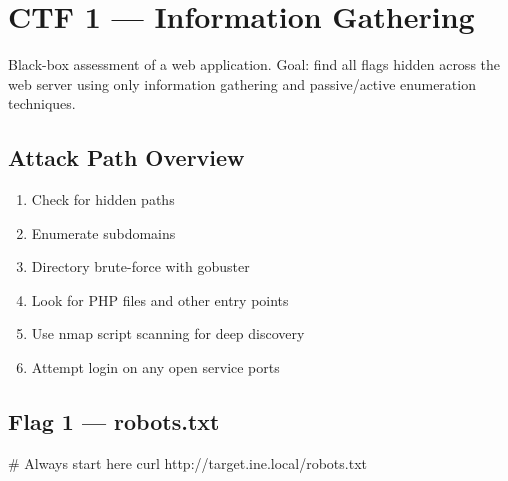 \chapter{CTF 1 --- Information Gathering}
\label{ctf:ctf1}

\begin{notebox}
Black-box assessment of a web application. Goal: find all flags hidden across
the web server using only information gathering and passive/active enumeration
techniques.
\end{notebox}

\section*{Attack Path Overview}

\begin{enumerate}
  \item Check  for hidden paths
  \item Enumerate subdomains
  \item Directory brute-force with gobuster
  \item Look for PHP files and other entry points
  \item Use nmap script scanning for deep discovery
  \item Attempt login on any open service ports
\end{enumerate}

\section*{Flag 1 --- robots.txt}



\begin{termbox}
# Always start here
curl http://target.ine.local/robots.txt
\end{termbox}


